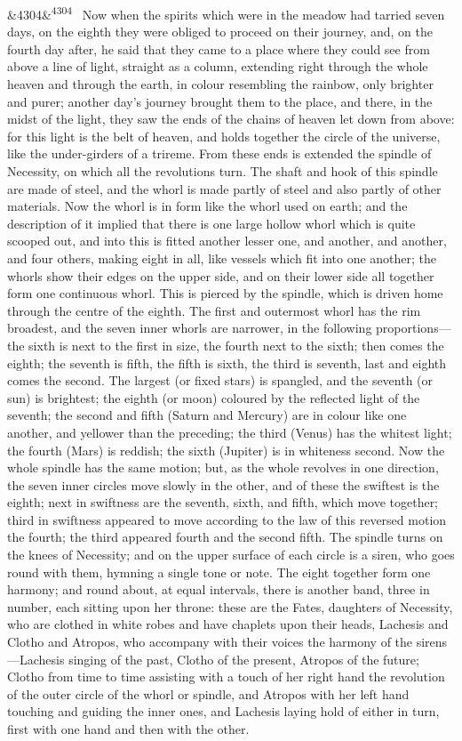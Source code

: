 \documentclass[12pt]{article}
\newcommand{\para}[1][]{\par\noindent\ifx&#1&\else\textsuperscript{\footnotesize #1}~\fi}
\begin{document}
\para[4304] Now when the spirits which were in the meadow had tarried seven days, on the eighth they were obliged to proceed on their journey, and, on the fourth day after, he said that they came to a place where they could see from above a line of light, straight as a column, extending right through the whole heaven and through the earth, in colour resembling the rainbow, only brighter and purer; another day's journey brought them to the place, and there, in the midst of the light, they saw the ends of the chains of heaven let down from above: for this light is the belt of heaven, and holds together the circle of the universe, like the under-girders of a trireme. From these ends is extended the spindle of Necessity, on which all the revolutions turn. The shaft and hook of this spindle are made of steel, and the whorl is made partly of steel and also partly of other materials. Now the whorl is in form like the whorl used on earth; and the description of it implied that there is one large hollow whorl which is quite scooped out, and into this is fitted another lesser one, and another, and another, and four others, making eight in all, like vessels which fit into one another; the whorls show their edges on the upper side, and on their lower side all together form one continuous whorl. This is pierced by the spindle, which is driven home through the centre of the eighth. The first and outermost whorl has the rim broadest, and the seven inner whorls are narrower, in the following proportions---the sixth is next to the first in size, the fourth next to the sixth; then comes the eighth; the seventh is fifth, the fifth is sixth, the third is seventh, last and eighth comes the second. The largest (or fixed stars) is spangled, and the seventh (or sun) is brightest; the eighth (or moon) coloured by the reflected light of the seventh; the second and fifth (Saturn and Mercury) are in colour like one another, and yellower than the preceding; the third (Venus) has the whitest light; the fourth (Mars) is reddish; the sixth (Jupiter) is in whiteness second. Now the whole spindle has the same motion; but, as the whole revolves in one direction, the seven inner circles move slowly in the other, and of these the swiftest is the eighth; next in swiftness are the seventh, sixth, and fifth, which move together; third in swiftness appeared to move according to the law of this reversed motion the fourth; the third appeared fourth and the second fifth. The spindle turns on the knees of Necessity; and on the upper surface of each circle is a siren, who goes round with them, hymning a single tone or note. The eight together form one harmony; and round about, at equal intervals, there is another band, three in number, each sitting upon her throne: these are the Fates, daughters of Necessity, who are clothed in white robes and have chaplets upon their heads, Lachesis and Clotho and Atropos, who accompany with their voices the harmony of the sirens---Lachesis singing of the past, Clotho of the present, Atropos of the future; Clotho from time to time assisting with a touch of her right hand the revolution of the outer circle of the whorl or spindle, and Atropos with her left hand touching and guiding the inner ones, and Lachesis laying hold of either in turn, first with one hand and then with the other.
\end{document}
